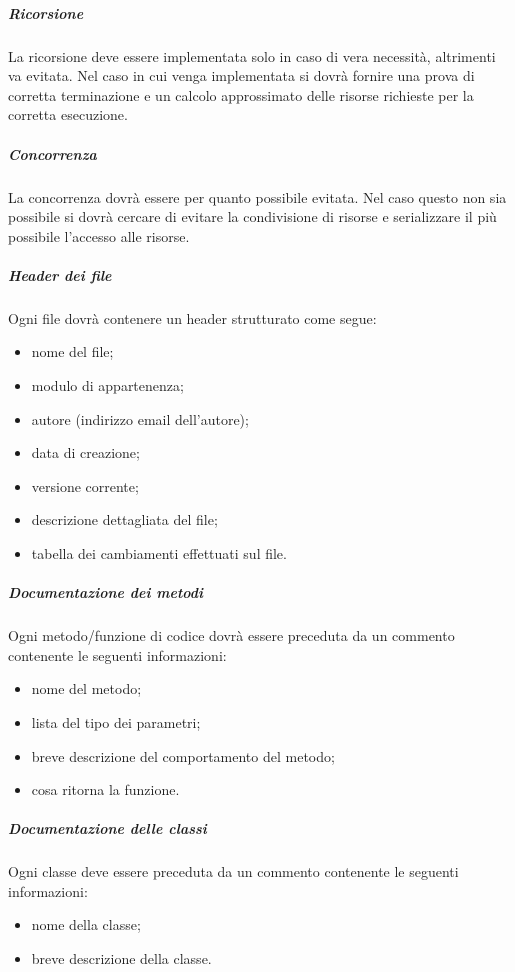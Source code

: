 \subparagraph{Ricorsione}
\label{}
La ricorsione deve essere implementata solo in caso di vera necessità, altrimenti va evitata. Nel caso in cui venga implementata si dovrà fornire una prova di corretta terminazione e un calcolo approssimato delle risorse richieste per la corretta esecuzione.

\subparagraph{Concorrenza}
\label{}

La concorrenza dovrà essere per quanto possibile evitata. Nel caso questo non sia possibile si dovrà cercare di evitare la condivisione di risorse e serializzare il più possibile l'accesso alle risorse.

\subparagraph{Header dei file}
\label{5.3.1}
Ogni file dovrà contenere un header strutturato come segue:
\begin{itemize}
\item {} nome del file;
\item {} modulo di appartenenza;
\item {} autore (indirizzo email dell'autore);
\item {} data di creazione;
\item {} versione corrente;
\item {} descrizione dettagliata del file;
\item {} tabella dei cambiamenti effettuati sul file.
\end{itemize}

\subparagraph{Documentazione dei metodi}
\label{5.3.2}
Ogni metodo/funzione di codice dovrà essere preceduta da un commento contenente le seguenti informazioni:
\begin{itemize}
\item {} nome del metodo;
\item {} lista del tipo dei parametri;
\item {} breve descrizione del comportamento del metodo;
\item {} cosa ritorna la funzione.
\end{itemize}

\subparagraph{Documentazione delle classi}
\label{5.3.3}
Ogni classe deve essere preceduta da un commento contenente le seguenti informazioni:
\begin{itemize}
\item {} nome della classe;
\item {} breve descrizione della classe.
\end{itemize}

